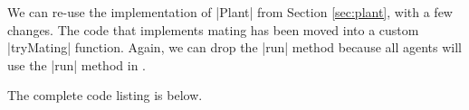 We can re-use the implementation of |Plant| from Section \ref{sec:plant},
with a few changes.
The code that implements mating has been moved into a custom
|tryMating| function.
Again, we can drop the |run| method because
all agents will use the |run| method in .

The complete code listing is below.


